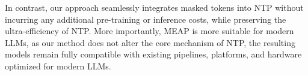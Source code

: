 In contrast, our approach seamlessly integrates masked tokens into NTP without incurring any additional pre-training or inference costs, while preserving the ultra-efficiency of NTP. More importantly, MEAP is more suitable for modern LLMs, as our method does not alter the core mechanism of NTP, the resulting models remain fully compatible with existing pipelines, platforms, and hardware optimized for modern LLMs. 

